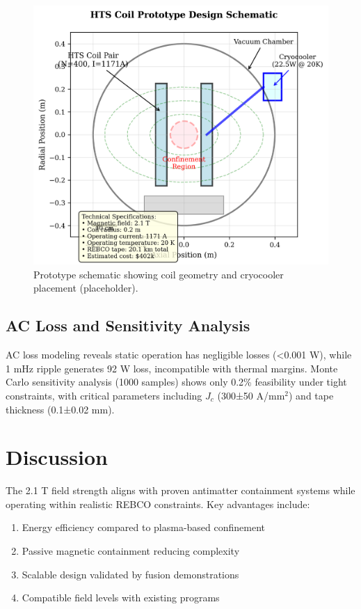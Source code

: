 \documentclass[10pt,twocolumn]{article}
\begin{document}
\begin{figure}[ht]
	\centering
	\includegraphics[width=0.9\columnwidth]{figures/prototype.png}
	\caption{Prototype schematic showing coil geometry and cryocooler placement (placeholder).}
	\label{fig:prototype}
\end{figure}

\subsection{AC Loss and Sensitivity Analysis}

AC loss modeling reveals static operation has negligible losses (<0.001 W), while 1 mHz ripple generates 92 W loss, incompatible with thermal margins. Monte Carlo sensitivity analysis (1000 samples) shows only 0.2\% feasibility under tight constraints, with critical parameters including $J_c$ (300±50 A/mm$^2$) and tape thickness (0.1±0.02 mm).

\section{Discussion}

The 2.1 T field strength aligns with proven antimatter containment systems while operating within realistic REBCO constraints. Key advantages include:
\begin{enumerate}
\item Energy efficiency compared to plasma-based confinement
\item Passive magnetic containment reducing complexity
\item Scalable design validated by fusion demonstrations \cite{sparc2020}
\item Compatible field levels with existing programs \cite{alpha2023}
\end{enumerate}
\end{document}
